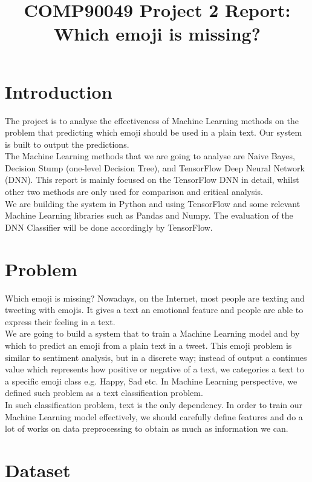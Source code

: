 \documentclass[12pt]{article}
\title{COMP90049 Project 2 Report: Which emoji is missing?}
\begin{document}
\maketitle

\section{Introduction}

The project is to analyse the effectiveness of Machine Learning methods on the problem that predicting which emoji should be used in a plain text. Our system is built to output the predictions.
\medskip \\
The Machine Learning methods that we are going to analyse are Naive Bayes, Decision Stump (one-level Decision Tree), and TensorFlow Deep Neural Network (DNN). This report is mainly focused on the TensorFlow DNN in detail, whilst other two methods are only used for comparison and critical analysis.
\medskip \\
We are building the system in Python and using TensorFlow and some relevant Machine Learning libraries such as Pandas and Numpy. The evaluation of the DNN Classifier will be done accordingly by TensorFlow.

\section{Problem}

Which emoji is missing? Nowadays, on the Internet, most people are texting and tweeting with emojis. It gives a text an emotional feature and people are able to express their feeling in a text.
\medskip \\
We are going to build a system that to train a Machine Learning model and by which to predict an emoji from a plain text in a tweet. This emoji problem is similar to sentiment analysis, but in a discrete way; instead of output a continues value which represents how positive or negative of a text, we categories a text to a specific emoji class e.g. Happy, Sad etc. In Machine Learning perspective, we defined such problem as a text classification problem.
\medskip \\
In such classification problem, text is the only dependency. In order to train our Machine Learning model effectively, we should carefully define features and do a lot of works on data preprocessing to obtain as much as information we can. 

\section{Dataset}
\end{document}
